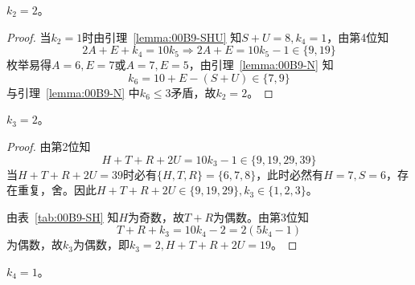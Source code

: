 \begin{lemma}
  $k_2 = 2$。
\end{lemma}

\begin{proof}
  当$k_2 = 1$时由引理~\ref{lemma:00B9-SHU} 知$S + U = 8, k_4 = 1$，由第4位知
  \[ 2A + E + k_4 = 10k_5 \Rightarrow 2A + E = 10k_5 - 1 \in \{9, 19\} \]
  枚举易得$A = 6, E = 7$或$A = 7, E = 5$，由引理~\ref{lemma:00B9-N} 知
  \[ k_6 = 10 + E - (S + U) \in \{7, 9\} \]
  与引理~\ref{lemma:00B9-N} 中$k_6 \le3$矛盾，故$k_2 = 2$。
\end{proof}

\begin{lemma} \label{lemma:00B9-k3}
  $k_3 = 2$。
\end{lemma}

\begin{proof}
  由第2位知
  \[ H + T + R + 2U = 10k_3 - 1 \in \{9, 19, 29, 39\} \]
  当$H + T + R + 2U = 39$时必有$\{H, T, R\} = \{6, 7, 8\}$，此时必然有$H = 7, S = 6$，存在重复，舍。因此$H + T + R + 2U \in \{9, 19, 29\}, k_3 \in \{1, 2, 3\}$。

  由表~\ref{tab:00B9-SH} 知$H$为奇数，故$T + R$为偶数。由第3位知
  \[ T + R + k_3 = 10k_4 - 2 = 2(5k_4 - 1) \]
  为偶数，故$k_3$为偶数，即$k_3 = 2, H + T + R + 2U = 19$。
\end{proof}

\begin{lemma}
  $k_4 = 1$。
\end{lemma}

